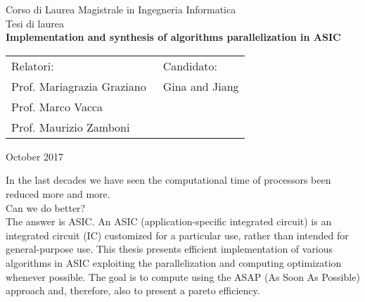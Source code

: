 \documentclass[12pt]{report}
\begin{document}
	\pagestyle{empty}
	\begin{center}
		
		Corso di Laurea Magistrale in Ingegneria Informatica\\ %
		\vspace{1cm}
		{\large Tesi di laurea}\\
		\vspace{1cm}
		{\Large \textbf{Implementation and synthesis of algorithms parallelization in ASIC}}\\ %
	\end{center}
	\vspace{1cm}
	\begin{tabular}{l l}
		Relatori:  &  Candidato: \\ %
		Prof. Mariagrazia Graziano \hspace{6 cm}$\,$ & Gina and Jiang \\
		Prof. Marco Vacca \\
		Prof. Maurizio Zamboni
		
	\end{tabular}
	\vspace{1cm}
	\begin{center}
		October 2017 \\ %
	\end{center}
	\vspace{1cm}
	
	In the last decades we have seen the computational time of processors been reduced more and more.\\
	Can we do better?\\
	The answer is ASIC. An ASIC (application-specific integrated circuit) is an integrated circuit (IC) customized for a particular use, rather than intended for general-purpose use.
	This thesis presents efficient implementation of various algorithms in ASIC exploiting the parallelization and computing optimization whenever possible. The goal is to compute using the ASAP (As Soon As Possible) approach and, therefore, also to present a pareto efficiency. \\
	
\end{document}
